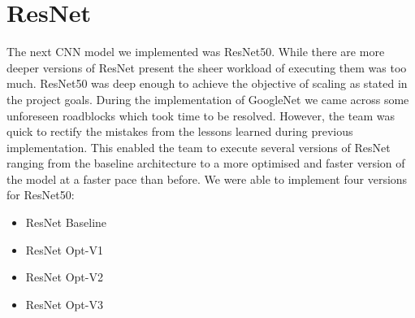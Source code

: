  
 
 
 
 
 
 
 
 




























\section{ResNet}
The next CNN model we implemented was ResNet50. While there are more deeper versions of ResNet present the sheer workload of executing them was too much. ResNet50 was deep enough to achieve the objective of scaling as stated in the project goals. During the implementation of GoogleNet we came across some unforeseen roadblocks which took time to be resolved. However, the team was quick to rectify the mistakes from the lessons learned during previous implementation. This enabled the team to execute several versions of ResNet ranging from the baseline architecture to a more optimised and faster version of the model at a faster pace than before.
We were able to implement four versions for ResNet50:
\begin{itemize}
    \item ResNet Baseline
    \item ResNet Opt-V1
    \item ResNet Opt-V2
    \item ResNet Opt-V3
\end{itemize}


